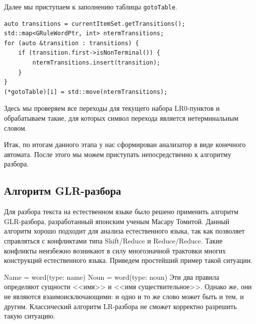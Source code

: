 Далее мы приступаем к заполнению таблицы \lstinline{gotoTable}.
\begin{lstlisting}
auto transitions = currentItemSet.getTransitions();
std::map<GRuleWordPtr, int> ntermTransitions;
for (auto &transition : transitions) {
    if (transition.first->isNonTerminal()) {
        ntermTransitions.insert(transition);
    }
}
(*gotoTable)[i] = std::move(ntermTransitions);
\end{lstlisting}
Здесь мы проверяем все переходы для текущего набора LR0-пунктов и обрабатываем такие, для которых символ перехода является нетерминальным словом.

Итак, по итогам данного этапа у нас сформирован анализатор в виде конечного автомата. После этого мы можем приступать непосредственно к алгоритму разбора.

\subsection{Алгоритм GLR-разбора}
Для разбора текста на естественном языке было решено применить алгоритм GLR-разбора, разработанный японским ученым Масару Томитой. Данный алгоритм хорошо подходит для анализа естественного языка, так как позволяет справляться с конфликтами типа Shift/Reduce и Reduce/Reduce. Такие конфликты неизбежно возникают в силу многозначной трактовки многих конструкций естественного языка. Приведем простейший пример такой ситуации.
\begin{myexample}
Name = word(type: name)\newline
Noun = word(type: noun)\newline
Эти два правила определяют сущности <<имя>> и <<имя существительное>>. Однако же, они не являются взаимоисключающими: и одно и то же слово может быть и тем, и другим. Классический алгоритм LR-разбора не сможет корректно разрешить такую ситуацию.
\end{myexample}

